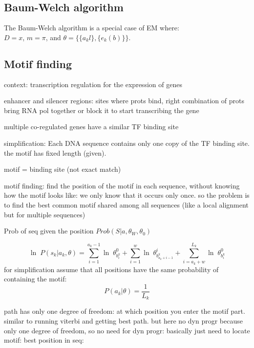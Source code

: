 \subsection{Baum-Welch algorithm}

The Baum-Welch algorithm is a special case of EM where:\\
$D=x$, $m=\pi$, and $\theta = \{ \{ a_kl \}, \{ e_k(b) \} \}$.

\subsection{Motif finding}

context: transcription regulation for the expression of genes

enhancer and silencer regions: sites where prots bind, right combination of prots bring RNA pol together or block it to start transcribing the gene

multiple co-regulated genes have a similar TF binding site

simplification: Each DNA sequence contains only one copy of the TF binding site. the motif has fixed length (given).

motif = binding site (not exact match)

motif finding: find the position of the motif in each sequence, without knowing how the motif looks like: we only know that it occurs only once. so the problem is to find the best common motif shared among all sequences (like a local alignment but for multiple sequences)

Prob of seq given the position $Prob(S|a,\theta_W, \theta_0)$

\begin{equation}
\ln \; P(s_k|a_k,\theta) = \sum_{i=1}^{a_k-1} \ln \; \theta_{b_i^k}^0
                  + \sum_{i=1}^w \ln \; \theta_{b_{a_k + i - 1}^k}^i
                  + \sum_{i=a_k+w}^{L_k} \ln \; \theta_{b_i^k}^0
\end{equation}
for simplification assume that all positions have the same probability of containing the motif:
\begin{equation}
P(a_k | \theta) = \frac{1}{L_k}
\end{equation}

path has only one degree of freedom: at which position you enter the motif part.
similar to running viterbi and getting best path.
but here no dyn progr because only one degree of freedom, so no need for dyn progr: basically just need to locate motif: best position in seq:

